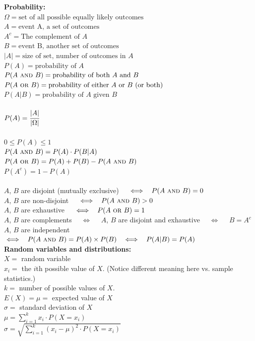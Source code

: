 \documentclass[12pt,letterpaper,addpoints]{exam}
\begin{document}
{\bf Probability:}\\
$\Omega = \text{set of all possible equally likely outcomes}$\\
$A = \text{event A, a set of outcomes}$\\
$A^c = \text{The complement of }A$\\
$B = \text{event B, another set of outcomes}$\\
$|A| = \text{size of set, number of outcomes in } A$\\
$P(A) = \text{probability of }A$\\
$P(A ~\textsc{and}~ B) = \text{probability of both $A$ and $B$}$\\
$P(A ~\textsc{or}~ B) = \text{probability of either $A$ or $B$ (or both)}$\\
$P(A | B) = \text{probability of $A$ given $B$}$\\\\
$P(A) = \cfrac{|A|}{|\Omega|}$\\\\
$0 \le P(A) \le 1$\\
$P(A ~\textsc{and}~ B) = P(A) \cdot P(B|A)$\\
$P(A ~\textsc{or}~ B) = P(A) + P(B) - P(A~\textsc{and}~ B)$\\
$P(A^c) = 1 - P(A)$
\\\\
$A$, $B$ are disjoint (mutually exclusive) ~~$\iff~~P(A~\textsc{and}~ B) = 0$\\
$A$, $B$ are non-disjoint ~~$\iff~~P(A~\textsc{and}~ B) > 0$\\
$A$, $B$ are exhaustive ~~$\iff~~P(A~\textsc{or}~ B) = 1$\\
$A$, $B$ are complements ~~$\iff$~~ $A$, $B$ are disjoint and exhaustive ~~$\iff$~~ $B=A^c$\\
$A$, $B$ are independent ~~$\iff~~P(A~\textsc{and}~ B) = P(A)\times P(B) ~~\iff~~ P(A|B)=P(A)$\\

{\bf Random variables and distributions:}\\
$X=$ random variable \\
$x_i=$ the $i$th possible value of $X$. (Notice different meaning here vs. sample statistics.)\\
$k=$ number of possible values of $X$.\\
$E(X)=\mu=$ expected value of $X$\\
$\sigma=$ standard deviation of $X$\\
$\mu = \sum_{i=1}^k  x_i \cdot P(X=x_i) $\\
$\sigma = \sqrt{\sum_{i=1}^k (x_i-\mu)^2 \cdot P(X=x_i)}$
\end{document}
